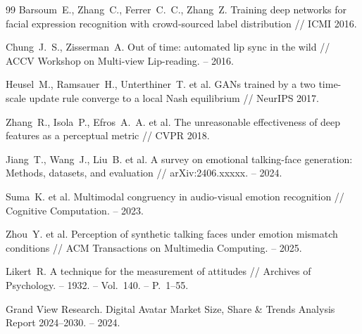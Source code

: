 \documentclass[a4paper, 12pt, oneside, openany]{article}
\begin{document}
\begin{thebibliography}{99}
Barsoum~E., Zhang~C., Ferrer~C.~C., Zhang~Z. Training deep networks for facial expression recognition with crowd-sourced label distribution // ICMI 2016.

Chung~J.~S., Zisserman~A. Out of time: automated lip sync in the wild // ACCV Workshop on Multi-view Lip-reading. -- 2016.

Heusel~M., Ramsauer~H., Unterthiner~T. et al. GANs trained by a two time-scale update rule converge to a local Nash equilibrium // NeurIPS 2017.

Zhang~R., Isola~P., Efros~A.~A. et al. The unreasonable effectiveness of deep features as a perceptual metric // CVPR 2018.

Jiang~T., Wang~J., Liu~B. et al. A survey on emotional talking-face generation: Methods, datasets, and evaluation // arXiv:2406.xxxxx. -- 2024.

Suma~K. et al. Multimodal congruency in audio-visual emotion recognition // Cognitive Computation. -- 2023.

Zhou~Y. et al. Perception of synthetic talking faces under emotion mismatch conditions // ACM Transactions on Multimedia Computing. -- 2025.

Likert~R. A technique for the measurement of attitudes // Archives of Psychology. -- 1932. -- Vol.~140. -- P.~1--55.

Grand View Research. Digital Avatar Market Size, Share \& Trends Analysis Report 2024--2030. -- 2024.

\end{thebibliography}

\newpage

\appendix %
\renewcommand{\thesection}{ПРИЛОЖЕНИЕ \Asbuk{section}}
\section{\centering}\label{PrilA}
\begin{center} 
\end{center}
\setcounter{equation}{0} %
\renewcommand{\theequation}{\Asbuk{section}.\arabic{equation}} %
\setcounter{table}{0} %
\renewcommand{\thetable}{\Asbuk{section}.\arabic{table}} %
\setcounter{figure}{0} %
\renewcommand{\thefigure}{\Asbuk{section}.\arabic{figure}} %
\end{document}
